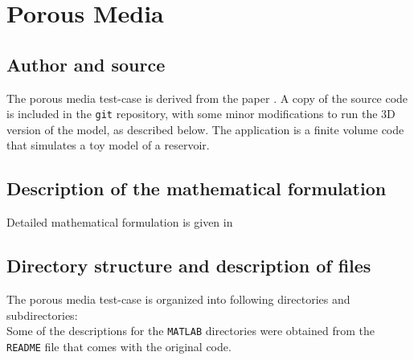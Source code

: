 \section{Porous Media}
\subsection{Author and source}
The porous media test-case is derived from the paper \cite{Aarnes_2007}. A copy of the source code is included in the \texttt{git} repository, with some minor modifications to run the 3D version of the model, as described below. The application is a finite volume code that simulates a toy model of a reservoir.
\subsection{Description of the mathematical formulation}\label{power_cont_adj_math}
Detailed mathematical formulation is given in \cite{Aarnes_2007}
\subsection{Directory structure and description of files}
The porous media test-case is organized into following directories and subdirectories:\\

\hfill\break
\noindent Some of the descriptions for the \texttt{MATLAB} directories were obtained from the \texttt{README} file that comes with the original code.
